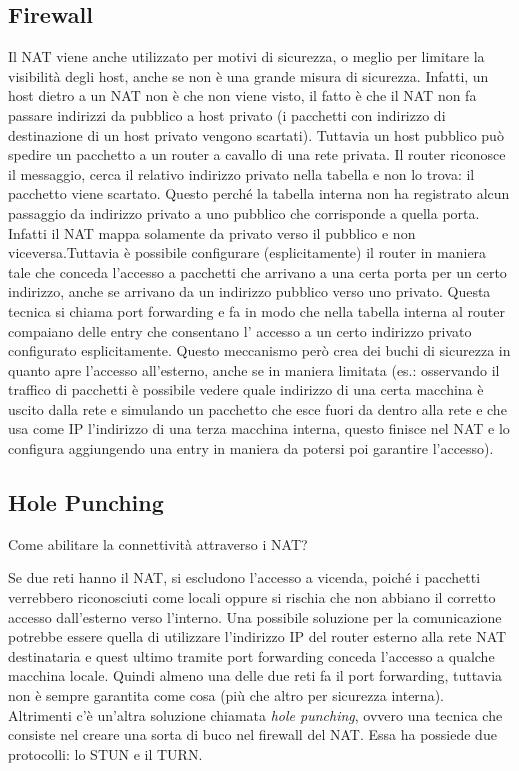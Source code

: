 \subsection{Firewall}
Il NAT viene anche utilizzato per motivi di sicurezza, o meglio per limitare la visibilità degli host, anche se non è una grande misura di sicurezza. Infatti, un host dietro a un NAT non è che non viene visto, il fatto è che il NAT non fa passare indirizzi da pubblico a host privato (i pacchetti con indirizzo di destinazione di un host privato vengono scartati). Tuttavia un host pubblico può spedire un pacchetto a un router a cavallo di una rete privata. Il router riconosce il messaggio, cerca il relativo indirizzo privato nella tabella e non lo trova: il pacchetto viene scartato. Questo perché la tabella interna non ha registrato alcun passaggio da indirizzo privato a uno pubblico che corrisponde a quella porta. Infatti il NAT mappa solamente da privato verso il pubblico e non viceversa.Tuttavia è possibile configurare (esplicitamente) il router in maniera tale che conceda l’accesso a pacchetti che arrivano a una certa porta per un certo indirizzo, anche se arrivano da un indirizzo pubblico verso uno privato. Questa tecnica si chiama port forwarding e fa in modo che nella tabella interna al router compaiano delle entry che consentano l’ accesso a un certo indirizzo privato configurato esplicitamente. Questo meccanismo però crea dei buchi di sicurezza in quanto apre l’accesso all’esterno, anche se in maniera limitata (es.: osservando il traffico di pacchetti è possibile vedere quale indirizzo di una certa macchina è uscito dalla rete e simulando un pacchetto che esce fuori da dentro alla rete e che usa come IP l’indirizzo di una terza macchina interna, questo finisce nel NAT e lo configura aggiungendo una entry in maniera da potersi poi garantire l’accesso).
\subsection{Hole Punching}
\begin{Question}
  Come abilitare la connettività attraverso i NAT?
\end{Question}
Se due reti hanno il NAT, si escludono l’accesso a vicenda, poiché i pacchetti verrebbero riconosciuti come locali oppure si rischia che non abbiano il corretto accesso dall’esterno verso l’interno. Una possibile soluzione per la comunicazione potrebbe essere quella di utilizzare l’indirizzo IP del router esterno alla rete NAT destinataria e quest ultimo tramite port forwarding conceda l’accesso a qualche macchina locale. Quindi almeno una delle due reti fa il port forwarding, tuttavia non è sempre garantita come cosa (più che altro per sicurezza interna). Altrimenti c’è un’altra soluzione chiamata \textit{hole punching}, ovvero una tecnica che consiste nel creare una sorta di buco nel firewall del NAT. Essa ha possiede due protocolli: lo STUN e il TURN.

